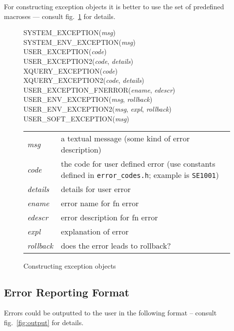 \documentclass{article}
\begin{document}
For constructing exception objects it is better to use the set of predefined macroses --- consult fig.~\ref{fig:macroses} for details.

\begin{figure}[hbt]
\centering
\begin{boxedminipage}{\textwidth}
\begin{description}
\item[SYSTEM\_EXCEPTION({\it msg})]
\item[SYSTEM\_ENV\_EXCEPTION({\it msg})]
\item[USER\_EXCEPTION({\it code})]
\item[USER\_EXCEPTION2({\it code}, {\it details})]
\item[XQUERY\_EXCEPTION({\it code})]
\item[XQUERY\_EXCEPTION2({\it code}, {\it details})]
\item[USER\_EXCEPTION\_FNERROR({\it ename}, {\it edescr})]
\item[USER\_ENV\_EXCEPTION({\it msg}, {\it rollback})]
\item[USER\_ENV\_EXCEPTION2({\it msg}, {\it expl}, {\it rollback})]
\item[USER\_SOFT\_EXCEPTION({\it msg})]
\end{description}
\end{boxedminipage}
\begin{tabular}{lp{5in}}
\it msg & a textual message (some kind of error description) \\
\it code & the code for user defined error (use constants defined in \verb|error_codes.h|; example is \verb|SE1001|)\\
\it details & details for user error\\
\it ename & error name for fn error\\
\it edescr &error description for fn error\\
\it expl & explanation of error\\
\it rollback & does the error leads to rollback?\\
\end{tabular}
\caption{Constructing exception objects}
\label{fig:macroses}
\end{figure}


\subsection{Error Reporting Format}

Errors could be outputted to the user in the following format -- consult fig.~\ref{fig:output} for details.
\end{document}
